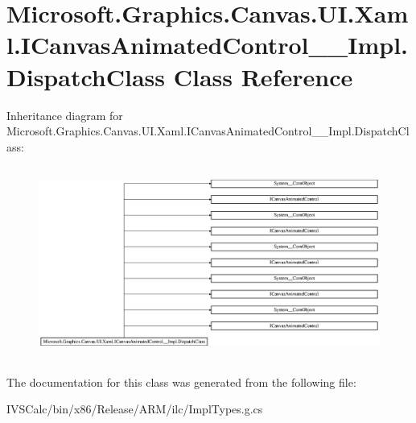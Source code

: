 \hypertarget{class_microsoft_1_1_graphics_1_1_canvas_1_1_u_i_1_1_xaml_1_1_i_canvas_animated_control_____impl_1_1_dispatch_class}{}\section{Microsoft.\+Graphics.\+Canvas.\+U\+I.\+Xaml.\+I\+Canvas\+Animated\+Control\+\_\+\+\_\+\+Impl.\+Dispatch\+Class Class Reference}
\label{class_microsoft_1_1_graphics_1_1_canvas_1_1_u_i_1_1_xaml_1_1_i_canvas_animated_control_____impl_1_1_dispatch_class}
Inheritance diagram for Microsoft.\+Graphics.\+Canvas.\+U\+I.\+Xaml.\+I\+Canvas\+Animated\+Control\+\_\+\+\_\+\+Impl.\+Dispatch\+Class\+:\begin{figure}[H]
\begin{center}
\leavevmode
\includegraphics[height=6.350515cm]{class_microsoft_1_1_graphics_1_1_canvas_1_1_u_i_1_1_xaml_1_1_i_canvas_animated_control_____impl_1_1_dispatch_class}
\end{center}
\end{figure}


The documentation for this class was generated from the following file\+:\begin{DoxyCompactItemize}
\item 
I\+V\+S\+Calc/bin/x86/\+Release/\+A\+R\+M/ilc/Impl\+Types.\+g.\+cs\end{DoxyCompactItemize}

